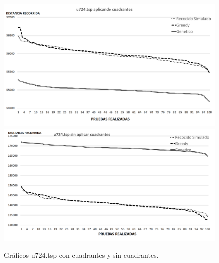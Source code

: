  \begin{figure}[hbtp]
    \centering
        \includegraphics[width=1\textwidth]{PruebasResultados/Experimentos_Graficos_Con/u724.png}
        \includegraphics[width=1\textwidth]{PruebasResultados/Experimentos_Graficos_Sin/u724.png}
        \caption{Gráficos u724.tsp con cuadrantes y sin cuadrantes.}
        \label{fig:u724_grafica.png}
\end{figure}
\newpage

